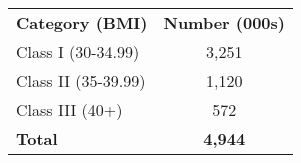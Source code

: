 \bgroup
\def\arraystretch{1.2}
\begin{tabular}{lc}
\toprule
\textbf{Category (BMI)} & \textbf{Number (000s)} \\ \cmidrule(lr){1-2}
Class I (30-34.99) & 3,251 \\
Class II (35-39.99) & 1,120 \\
Class III (40+) & 572 \\ \cmidrule(lr){1-2}
\textbf{Total} & \textbf{4,944} \\
\bottomrule
\end{tabular}
\egroup